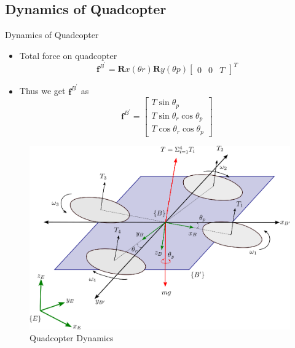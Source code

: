 \documentclass[10pt]{beamer}
\begin{document}
\subsection*{Dynamics of Quadcopter}
\begin{frame}{Dynamics of Quadcopter}
    \begin{minipage}{0.47\textwidth}
    \begin{itemize}
         \item Total force on quadcopter 
            \begin{equation*}
            \mathbf{f}^{B^{\prime}}=\mathbf{R}{x}\left(\theta{r}\right) \mathbf{R}{y}\left(\theta{p}\right)\begin{bmatrix}
            0 & 0 & T
            \end{bmatrix}^{T}\label{eq:total_force}
            \end{equation*}

            \item Thus we get $\mathbf{f}^{B^{\prime}}$ as  
            \begin{equation*}
            \mathbf{f}^{B^{\prime}}=\begin{bmatrix}
            T\sin{\theta_{p}} \\
            T\sin{\theta_{r}}\cos{\theta_{p}} \\
            T\cos{\theta_{r}}\cos{\theta_{p}}
            \end{bmatrix}
            \end{equation*}
    \end{itemize}	
	\end{minipage}
	\begin{minipage}{0.47\textwidth}
             \begin{figure}[h!]
			\centering
			\includegraphics[scale=0.28]{Quadcopter.eps} 
			\caption{Quadcopter Dynamics}
			\label{Fig:Quadcopter Dynamics}
		\end{figure}
	\end{minipage}
        

\end{frame}
\end{document}
